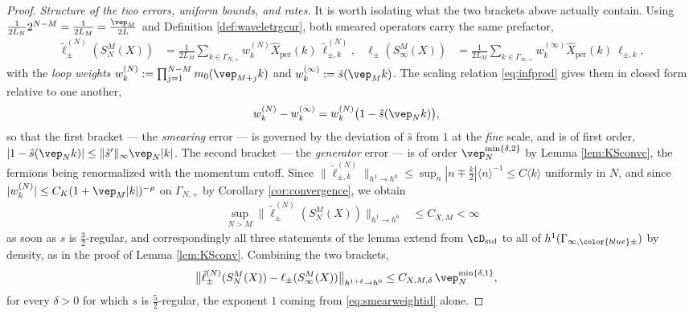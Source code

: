 \documentclass[a4paper, 11pt]{article}
\DeclareMathOperator{\1}{\mathds{1}}
\DeclareMathOperator{\std}{std}
\DeclareMathOperator{\per}{per}
\begin{document}
\begin{proof}
\emph{Structure of the two errors, uniform bounds, and rates.} It is worth isolating what the two brackets above actually contain. Using $\tfrac{1}{2L_{N}}2^{N-M}=\tfrac{1}{2L_{M}}=\tfrac{\vep_{M}}{2L}$ and Definition \ref{def:waveletrgcur}, both smeared operators carry the same prefactor,
\begin{align}
\label{eq:smearedweights}
\tilde{\ell}^{(N)}_{\pm}(S^{M}_{N}(X)) & = \tfrac{1}{2L_{M}}\!\!\!\sum_{k\in\Gamma_{N,+}}\!\!\!w^{(N)}_{k}\hat{X}_{\per}(k)\!\ \tilde{\ell}^{(N)}_{\pm,k}, & \ell_{\pm}(S^{M}_{\infty}(X)) & = \tfrac{1}{2L_{M}}\!\!\!\sum_{k\in\Gamma_{\infty,+}}\!\!\!w^{(\infty)}_{k}\hat{X}_{\per}(k)\!\ \ell_{\pm,k},
\end{align}
with the \emph{loop weights} $w^{(N)}_{k}:=\prod_{j=1}^{N-M}m_{0}(\vep_{M+j}k)$ and $w^{(\infty)}_{k}:=\hat{s}(\vep_{M}k)$. The scaling relation \eqref{eq:infprod} gives them in closed form relative to one another,
\begin{align}
\label{eq:smearweightid}
w^{(N)}_{k}-w^{(\infty)}_{k} & = w^{(N)}_{k}\big(1-\hat{s}(\vep_{N}k)\big),
\end{align}
so that the first bracket --- the \emph{smearing} error --- is governed by the deviation of $\hat{s}$ from $1$ at the \emph{fine} scale, and is of first order, $|1-\hat{s}(\vep_{N}k)|\leq\|\hat{s}'\|_{\infty}\vep_{N}|k|$. The second bracket --- the \emph{generator} error --- is of order $\vep_{N}^{\min\{\delta,2\}}$ by Lemma \ref{lem:KSconvc}, the fermions being renormalized with the momentum cutoff. Since $\|\tilde{\ell}^{(N)}_{\pm,k}\|_{h^{1}\rightarrow h^{0}}\leq\sup_{n}|n\mp\tfrac{k}{2}|\langle n\rangle^{-1}\leq C\langle k\rangle$ uniformly in $N$, and since $|w^{(N)}_{k}|\leq C_{K}(1+\vep_{M}|k|)^{-\rho}$ on $\Gamma_{N,+}$ by Corollary \ref{cor:convergence}, we obtain
\begin{align}
\label{eq:smearedunifbound}
\sup_{N>M}\big\|\tilde{\ell}^{(N)}_{\pm}(S^{M}_{N}(X))\big\|_{h^{1}\rightarrow h^{0}} & \leq C_{X,M} < \infty
\end{align}
as soon as $s$ is $\tfrac{3}{2}$-regular, and correspondingly all three statements of the lemma extend from $\cD_{\std}$ to all of $h^{1}(\Gamma_{\infty,{\color{blue}\pm}})$ by density, as in the proof of Lemma \ref{lem:KSconv}. Combining the two brackets,
\begin{align}
\label{eq:smearedrate}
\big\|\tilde{\ell}^{(N)}_{\pm}(S^{M}_{N}(X))-\ell_{\pm}(S^{M}_{\infty}(X))\big\|_{h^{1+\delta}\rightarrow h^{0}} & \leq C_{X,M,\delta}\!\ \vep_{N}^{\min\{\delta,1\}},
\end{align}
for every $\delta>0$ for which $s$ is $\tfrac{5}{2}$-regular, the exponent $1$ coming from \eqref{eq:smearweightid} alone.
\end{proof}
\end{document}
